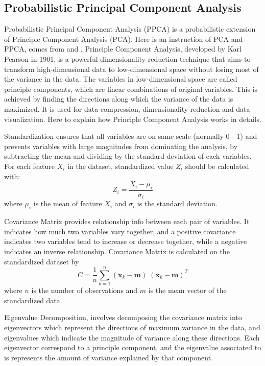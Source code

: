 \documentclass[12pt,a4paper,english
]{tunithesis}
\begin{document}
\subsection{Probabilistic Principal Component Analysis}
Probabilistic Principal Component Analysis (PPCA) is a probabilistic extension of Principle Component Analysis (PCA). Here is an instruction of PCA and PPCA, comes from \textcite{lindsay2002} and \textcite{tipping2002}.
Principle Component Analysis, developed by Karl Pearson in 1901, is a powerful dimensionality reduction technique that aims to transform high-dimensional data to low-dimensional space without losing most of the variance in the data. \parencite{mackiewicz1993} The variables in low-dimensional space are called principle components, which are linear combinations of original variables. This is achieved by finding the directions along which the variance of the data is maximized. It is used for data compression, dimensionality reduction and data visualization. Here to explain how Principle Component Analysis works in details.

Standardization ensures that all variables are on same scale (normally 0 - 1) and prevents variables with large magnitudes from dominating the analysis, by subtracting the mean and dividing by the standard deviation of each variables. For each feature $X_i$ in the dataset, standardized value $Z_i$ should be calculated with:
\begin{equation*}
    {Z_i} = {\frac {{X_i}-{\mu_i}}{\sigma_i}}
\end{equation*}
where $\mu_i$ is the mean of feature $X_i$ and $\sigma_i$ is the standard deviation.

Covariance Matrix provides relationship info between each pair of variables. It indicates how much two variables vary together, and a positive covariance indicates two variables tend to increase or decrease together, while a negative indicates an inverse relationship. Covariance Matrix is calculated on the standardized dataset by 
\begin{equation*}
    C = \frac{1}{n}\sum\limits_{k=1}^n (\pmb x_k - \pmb m)\;(\pmb x_k - \pmb m)^T
\end{equation*}
where $n$ is the number of observations and $m$ is the mean vector of the standardized data.

Eigenvalue Decomposition, involves decomposing the covariance matrix into eigenvectors which represent the directions of maximum variance in the data, and eigenvalues which indicate the magnitude of variance along these directions. Each eigenvector correspond to a principle component, and the eigenvalue associated to is represents the amount of variance explained by that component. 
\end{document}
